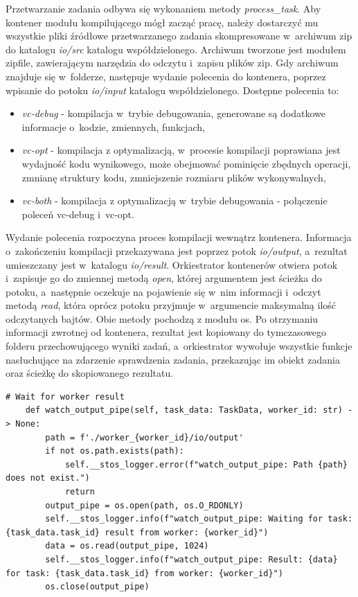 Przetwarzanie zadania odbywa się wykonaniem metody \textit{process\_task}. Aby kontener modułu kompilującego mógł zacząć pracę, należy dostarczyć mu wszystkie pliki źródłowe przetwarzanego zadania skompresowane w~archiwum zip do katalogu \textit{io/src} katalogu współdzielonego. Archiwum tworzone jest modułem zipfile\cite{pythonZipfile}, zawierającym narzędzia do odczytu i~zapisu plików zip. Gdy archiwum znajduje się w~folderze, następuje wydanie polecenia do kontenera, poprzez wpisanie do potoku \textit{io/input} katalogu współdzielonego. Dostępne polecenia to:
\begin{itemize}
    \item \textit{vc-debug} - kompilacja w~trybie debugowania, generowane są dodatkowe informacje o~kodzie, zmiennych, funkcjach,
    \item \textit{vc-opt} - kompilacja z optymalizacją, w~procesie kompilacji poprawiana jest wydajność kodu wynikowego, może obejmować pominięcie zbędnych operacji, zmnianę struktury kodu, zmniejszenie rozmiaru plików wykonywalnych,
    \item \textit{vc-both} - kompilacja z optymalizacją w~trybie debugowania - połączenie poleceń vc-debug i~vc-opt.
\end{itemize}
Wydanie polecenia rozpoczyna proces kompilacji wewnątrz kontenera. Informacja o~zakończeniu kompilacji przekazywana jest poprzez potok \textit{io/output}, a~rezultat umieszczany jest w~katalogu \textit{io/result}. Orkiestrator kontenerów otwiera potok i~zapisuje go do zmiennej metodą \textit{open}, której argumentem jest ścieżka do potoku, a~następnie oczekuje na pojawienie się w~nim informacji i~odczyt metodą \textit{read}, która oprócz potoku przyjmuje w~argumencie maksymalną ilość odczytanych bajtów. Obie metody pochodzą z modułu os\cite{pytohnOs}. Po otrzymaniu informacji zwrotnej od kontenera, rezultat jest kopiowany do tymczasowego folderu przechowującego wyniki zadań, a~orkiestrator wywołuje wszystkie funkcje nasłuchujące na zdarzenie sprawdzenia zadania, przekazując im obiekt zadania oraz ścieżkę do skopiowanego rezultatu.

\lstset{style=python}
\begin{lstlisting}[caption = {Implementacja metody odczytującej informacje z potoku.}]
    # Wait for worker result 
    def watch_output_pipe(self, task_data: TaskData, worker_id: str) -> None:
        path = f'./worker_{worker_id}/io/output'
        if not os.path.exists(path):
            self.__stos_logger.error(f"watch_output_pipe: Path {path} does not exist.")
            return
        output_pipe = os.open(path, os.O_RDONLY)
        self.__stos_logger.info(f"watch_output_pipe: Waiting for task: {task_data.task_id} result from worker: {worker_id}")
        data = os.read(output_pipe, 1024)
        self.__stos_logger.info(f"watch_output_pipe: Result: {data} for task: {task_data.task_id} from worker: {worker_id}")
        os.close(output_pipe)
\end{lstlisting}

